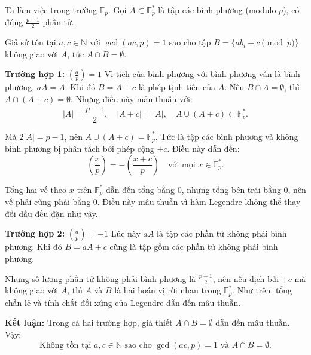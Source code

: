 \documentclass[../08-quadratic-residues.tex]{subfiles}
\begin{document}
\begin{soln}\footnotemark
    Ta làm việc trong trường \( \mathbb{F}_p \). Gọi \( A \subset \mathbb{F}_p^* \) là tập các bình phương (modulo \(p\)), có đúng \( \frac{p-1}{2} \) phần tử.  
    
	Giả sử tồn tại \( a, c \in \mathbb{N} \) với \( \gcd(ac, p) = 1 \) sao cho tập \( B = \{ ab_i + c \pmod{p} \} \) không giao với \( A \), tức \( A \cap B = \emptyset \).

    \textbf{Trường hợp 1:} \( \left( \frac{a}{p} \right) = 1 \)  
    Vì tích của bình phương với bình phương vẫn là bình phương, \( aA = A \). Khi đó \( B = A + c \) là phép tịnh tiến của \( A \). Nếu \( B \cap A = \emptyset \), thì \( A \cap (A + c) = \emptyset \). Nhưng điều này mâu thuẫn với:
    \[
        |A| = \frac{p-1}{2}, \quad |A + c| = |A|, \quad A \cup (A + c) \subset \mathbb{F}_p^*.
    \]
    
	Mà \( 2|A| = p - 1 \), nên \( A \cup (A + c) = \mathbb{F}_p^* \). Tức là tập các bình phương và không bình phương bị phân tách bởi phép cộng \( +c \). Điều này dẫn đến:
    \[
        \left( \frac{x}{p} \right) = - \left( \frac{x + c}{p} \right) \quad \text{với mọi } x \in \mathbb{F}_p^*.
    \]
    
	Tổng hai vế theo \( x \) trên \( \mathbb{F}_p^* \) dẫn đến tổng bằng 0, nhưng tổng bên trái bằng 0, nên vế phải cũng phải bằng 0. Điều này mâu thuẫn vì hàm Legendre không thể thay đổi dấu đều đặn như vậy.

    \textbf{Trường hợp 2:} \( \left( \frac{a}{p} \right) = -1 \)  
    Lúc này \( aA \) là tập các phần tử không phải bình phương. Khi đó \( B = aA + c \) cũng là tập gồm các phần tử không phải bình phương.  

	Nhưng số lượng phần tử không phải bình phương là \( \frac{p-1}{2} \), nên nếu dịch bởi \( +c \) mà không giao với \( A \), thì \( A \) và \( B \) là hai hoán vị rời nhau trong \( \mathbb{F}_p^* \). Như trên, tổng chẵn lẻ và tính chất đối xứng của Legendre dẫn đến mâu thuẫn.

    \textbf{Kết luận:} Trong cả hai trường hợp, giả thiết \( A \cap B = \emptyset \) dẫn đến mâu thuẫn. Vậy:
    \[
        \boxed{\text{Không tồn tại } a, c \in \mathbb{N} \text{ sao cho } \gcd(ac, p) = 1 \text{ và } A \cap B = \emptyset.}
    \]
\end{soln}

\end{document}
